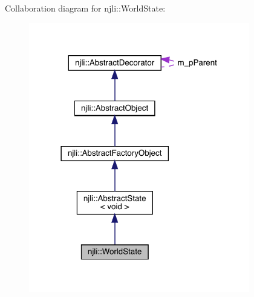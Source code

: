 Collaboration diagram for njli\+:\+:World\+State\+:\nopagebreak
\begin{figure}[H]
\begin{center}
\leavevmode
\includegraphics[width=273pt]{classnjli_1_1_world_state__coll__graph}
\end{center}
\end{figure}
